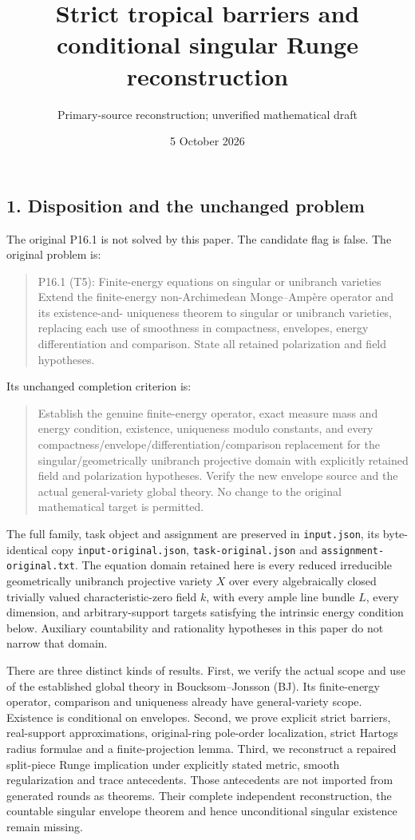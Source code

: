 \documentclass[
  10pt,
]{article}
\title{Strict tropical barriers and conditional singular Runge
reconstruction}
\author{Primary-source reconstruction; unverified mathematical draft}
\date{5 October 2026}
\begin{document}
\maketitle

\subsection{1. Disposition and the unchanged
problem}\label{disposition-and-the-unchanged-problem}

The original P16.1 is not solved by this paper. The candidate flag is
false. The original problem is:

\begin{quote}
P16.1 (T5): Finite-energy equations on singular or unibranch varieties
Extend the ﬁnite-energy non-Archimedean Monge--Ampère operator and its
existence-and- uniqueness theorem to singular or unibranch varieties,
replacing each use of smoothness in compactness, envelopes, energy
diﬀerentiation and comparison. State all retained polarization and ﬁeld
hypotheses.
\end{quote}

Its unchanged completion criterion is:

\begin{quote}
Establish the genuine finite-energy operator, exact measure mass and
energy condition, existence, uniqueness modulo constants, and every
compactness/envelope/differentiation/comparison replacement for the
singular/geometrically unibranch projective domain with explicitly
retained field and polarization hypotheses. Verify the new envelope
source and the actual general-variety global theory. No change to the
original mathematical target is permitted.
\end{quote}

The full family, task object and assignment are preserved in
\texttt{input.json}, its byte-identical copy
\texttt{input-original.json}, \texttt{task-original.json} and
\texttt{assignment-original.txt}. The equation domain retained here is
every reduced irreducible geometrically unibranch projective variety
\(X\) over every algebraically closed trivially valued
characteristic-zero field \(k\), with every ample line bundle \(L\),
every dimension, and arbitrary-support targets satisfying the intrinsic
energy condition below. Auxiliary countability and rationality
hypotheses in this paper do not narrow that domain.

There are three distinct kinds of results. First, we verify the actual
scope and use of the established global theory in Boucksom--Jonsson
(BJ). Its finite-energy operator, comparison and uniqueness already have
general-variety scope. Existence is conditional on envelopes. Second, we
prove explicit strict barriers, real-support approximations,
original-ring pole-order localization, strict Hartogs radius formulae
and a finite-projection lemma. Third, we reconstruct a repaired
split-piece Runge implication under explicitly stated metric, smooth
regularization and trace antecedents. Those antecedents are not imported
from generated rounds as theorems. Their complete independent
reconstruction, the countable singular envelope theorem and hence
unconditional singular existence remain missing.
\end{document}
